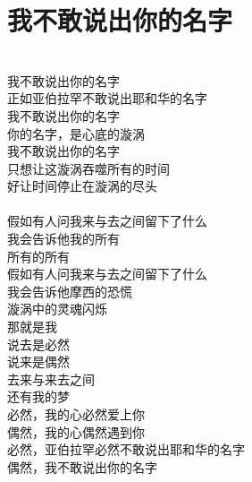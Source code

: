 \chapter{我不敢说出你的名字}

\leftskip=25mm

\noindent \\
我不敢说出你的名字\\
正如亚伯拉罕不敢说出耶和华的名字\\

我不敢说出你的名字\\
你的名字，是心底的漩涡\\
我不敢说出你的名字\\
只想让这漩涡吞噬所有的时间\\
好让时间停止在漩涡的尽头\\
\\
假如有人问我来与去之间留下了什么\\
我会告诉他我的所有\\
所有的所有\\
假如有人问我来与去之间留下了什么\\
我会告诉他摩西的恐慌\\
漩涡中的灵魂闪烁\\
那就是我\\

说去是必然\\
说来是偶然\\
去来与来去之间\\
还有我的梦\\
必然，我的心必然爱上你\\
偶然，我的心偶然遇到你\\
必然，亚伯拉罕必然不敢说出耶和华的名字\\
偶然，我不敢说出你的名字

